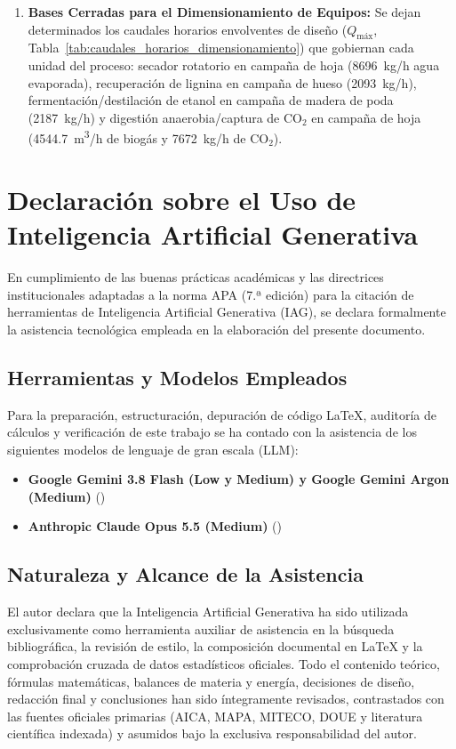 \documentclass{report}
\begin{document}
\begin{enumerate}
    \item \textbf{Bases Cerradas para el Dimensionamiento de Equipos:} Se dejan determinados los caudales horarios envolventes de diseño ($Q_{\text{máx}}$, Tabla~\ref{tab:caudales_horarios_dimensionamiento}) que gobiernan cada unidad del proceso: secador rotatorio en campaña de hoja (\SI{8696}{\kilo\gram/\hour} agua evaporada), recuperación de lignina en campaña de hueso (\SI{2093}{\kilo\gram/\hour}), fermentación/destilación de etanol en campaña de madera de poda (\SI{2187}{\kilo\gram/\hour}) y digestión anaerobia/captura de $\text{CO}_2$ en campaña de hoja (\SI{4544.7}{\cubic\meter/\hour} de biogás y \SI{7672}{\kilo\gram/\hour} de $\text{CO}_2$).
\end{enumerate}

\newpage
\chapter*{Declaración sobre el Uso de Inteligencia Artificial Generativa}

En cumplimiento de las buenas prácticas académicas y las directrices institucionales adaptadas a la norma APA (7.ª edición) para la citación de herramientas de Inteligencia Artificial Generativa (IAG), se declara formalmente la asistencia tecnológica empleada en la elaboración del presente documento.

\section*{Herramientas y Modelos Empleados}
Para la preparación, estructuración, depuración de código LaTeX, auditoría de cálculos y verificación de este trabajo se ha contado con la asistencia de los siguientes modelos de lenguaje de gran escala (LLM):
\begin{itemize}
    \item \textbf{Google Gemini 3.8 Flash (Low y Medium) y Google Gemini Argon (Medium)} (\cite{google_gemini_2026})
    \item \textbf{Anthropic Claude Opus 5.5 (Medium)} (\cite{anthropic_claude_2026})
\end{itemize}

\section*{Naturaleza y Alcance de la Asistencia}
El autor declara que la Inteligencia Artificial Generativa ha sido utilizada exclusivamente como herramienta auxiliar de asistencia en la búsqueda bibliográfica, la revisión de estilo, la composición documental en LaTeX y la comprobación cruzada de datos estadísticos oficiales. Todo el contenido teórico, fórmulas matemáticas, balances de materia y energía, decisiones de diseño, redacción final y conclusiones han sido íntegramente revisados, contrastados con las fuentes oficiales primarias (AICA, MAPA, MITECO, DOUE y literatura científica indexada) y asumidos bajo la exclusiva responsabilidad del autor.
\end{document}
